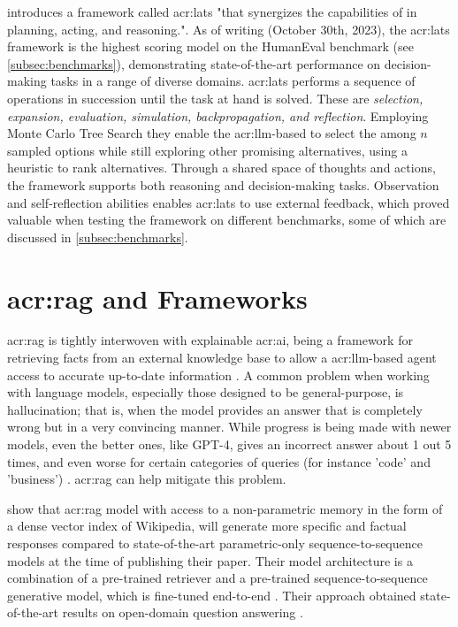\cite{zhouLanguageAgentTree2023} introduces a framework called \gls{acr:lats} "that synergizes the capabilities of  in planning, acting, and reasoning.". As of writing (October 30th, 2023), the \gls{acr:lats} framework is the highest scoring model on the HumanEval benchmark (see \autoref{subsec:benchmarks}), demonstrating state-of-the-art performance on decision-making tasks in a range of diverse domains. \gls{acr:lats} performs a sequence of operations in succession until the task at hand is solved. These are \textit{selection, expansion, evaluation, simulation, backpropagation, and reflection}. Employing Monte Carlo Tree Search they enable the \acrshort{acr:llm}-based to select the among $n$ sampled options while still exploring other promising alternatives, using a heuristic to rank alternatives. Through a shared space of thoughts and actions, the framework supports both reasoning and decision-making tasks. Observation and self-reflection abilities enables \acrshort{acr:lats} to use external feedback, which proved valuable when testing the framework on different benchmarks, some of which are discussed in \autoref{subsec:benchmarks}.



\section[Retrieval Augmented Generation and Frameworks]{\acrlong{acr:rag} and Frameworks}\label{sec:retrieval-automented-generation}

\gls{acr:rag} is tightly interwoven with explainable \acrshort{acr:ai}, being a framework for retrieving facts from an external knowledge base to allow a \acrshort{acr:llm}-based agent access to accurate up-to-date information \citep{martineauWhatRetrievalaugmentedGeneration2023}. A common problem when working with language models, especially those designed to be general-purpose, is hallucination; that is, when the model provides an answer that is completely wrong but in a very convincing manner. While progress is being made with newer models, even the better ones, like GPT-4, gives an incorrect answer about 1 out 5 times, and even worse for certain categories of queries (for instance 'code' and 'business') \citep[10]{openaiGPT4TechnicalReport2023}. \acrlong{acr:rag} can help mitigate this problem.

\cite{lewisRetrievalAugmentedGenerationKnowledgeIntensive2020} show that \gls{acr:rag} model with access to a non-parametric memory in the form of a dense vector index of Wikipedia, will generate more specific and factual responses compared to state-of-the-art parametric-only sequence-to-sequence models at the time of publishing their paper. Their model architecture is a combination of a pre-trained retriever and a pre-trained sequence-to-sequence generative model, which is fine-tuned end-to-end \citep[2]{lewisRetrievalAugmentedGenerationKnowledgeIntensive2020}. Their approach obtained state-of-the-art results on open-domain question answering \citep[5-6]{lewisRetrievalAugmentedGenerationKnowledgeIntensive2020}.

